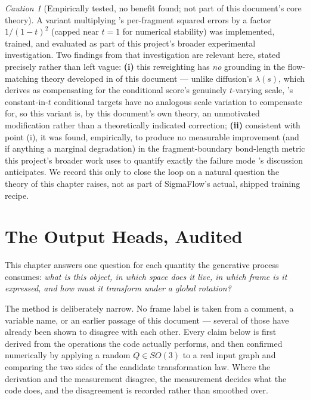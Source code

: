 \documentclass[11pt,a4paper]{report}
\theoremstyle{definition}
\theoremstyle{remark}
\newtheorem{caution}[caution]{Caution}
\begin{document}
\begin{caution}[Empirically tested, no benefit found; not part of this document's core theory]
\label{caution:time-weighting-empirical}
A variant multiplying 's per-fragment squared
errors by a factor $1/(1-t)^2$ (capped near $t=1$ for numerical stability)
was implemented, trained, and evaluated as part of this project's broader
experimental investigation. Two findings from that investigation are
relevant here, stated precisely rather than left vague: \textbf{(i)}
this reweighting has \emph{no} grounding in the flow-matching theory
developed in  of this document
--- unlike diffusion's $\lambda(s)$, which  derives
as compensating for the conditional score's genuinely $t$-varying scale,
's constant-in-$t$ conditional targets have
no analogous scale variation to compensate for, so this variant is, by this
document's own theory, an unmotivated modification rather than a
theoretically indicated correction; \textbf{(ii)} consistent with point
(i), it was found, empirically, to produce no measurable improvement (and
if anything a marginal degradation) in the fragment-boundary bond-length
metric this project's broader work uses to quantify exactly the failure
mode 's discussion anticipates. We record
this only to close the loop on a natural question the theory of this
chapter raises, not as part of SigmaFlow's actual, shipped training
recipe.
\end{caution}

\clearpage

\chapter{The Output Heads, Audited}
\label{chap:output-heads}

This chapter answers one question for each quantity the generative process
consumes: \emph{what is this object, in which space does it live, in which
frame is it expressed, and how must it transform under a global rotation?}

The method is deliberately narrow. No frame label is taken from a comment, a
variable name, or an earlier passage of this document --- several of those
have already been shown to disagree with each other. Every claim below is
first derived from the operations the code actually performs, and then
confirmed numerically by applying a random $Q\in SO(3)$ to a real input graph
and comparing the two sides of the candidate transformation law. Where the
derivation and the measurement disagree, the measurement decides what the
code does, and the disagreement is recorded rather than smoothed over.
\end{document}
